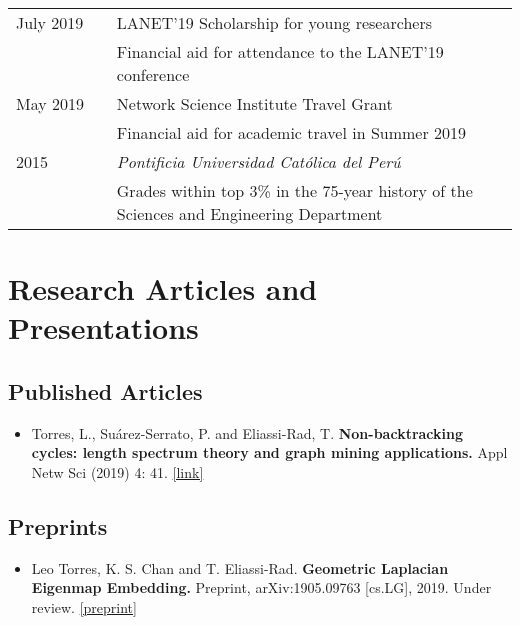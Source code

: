 \documentclass[12pt,]{scrartcl}
\begin{document}
\begin{table}[!h]
{\def\arraystretch{1.5}\tabcolsep=0pt
\begin{tabular}{p{0.2\linewidth}p{0.8\linewidth}}

July 2019 & LANET'19 Scholarship for young researchers \\
& Financial aid for attendance to the LANET'19 conference \\

May 2019 & Network Science Institute Travel Grant \\
& Financial aid for academic travel in Summer 2019 \\

2015 & \textit{Pontificia Universidad Católica del Perú} \\
& Grades within top 3\% in the 75-year history of the Sciences and Engineering Department \\

\end{tabular}%
}
\end{table}


\newpage
\section{Research Articles and Presentations}\label{publications}

\subsection{Published Articles}\label{articles}

\begin{itemize}
\leftskip-0.25in %

\item Torres, L., Su\'arez-Serrato, P. and Eliassi-Rad, T.  \textbf{Non-backtracking cycles: length spectrum theory and graph mining applications.}  Appl Netw Sci (2019) 4: 41. \href{https://doi.org/10.1007/s41109-019-0147-y}{[link]}

\end{itemize}


\subsection{Preprints}\label{preprints}

\begin{itemize}
\leftskip-0.25in %

\item Leo Torres, K. S. Chan and T. Eliassi-Rad. \textbf{Geometric Laplacian Eigenmap Embedding.} Preprint, arXiv:1905.09763 [cs.LG], 2019. Under review. \href{https://arxiv.org/abs/1905.09763}{[preprint]}

\end{itemize}
\end{document}
